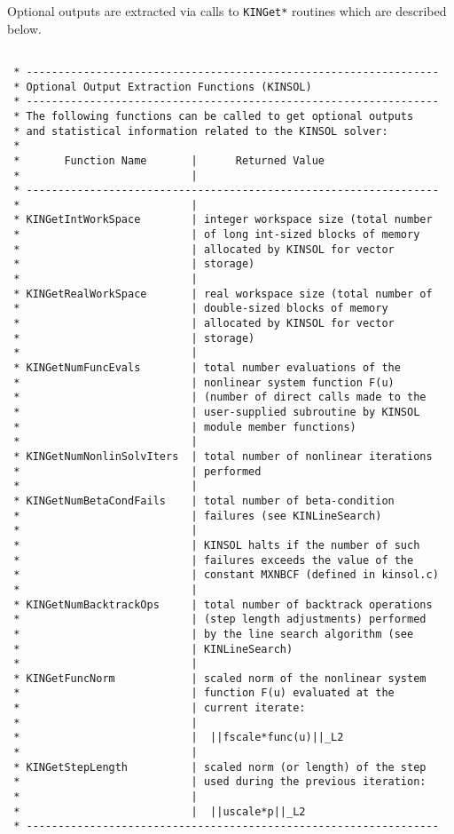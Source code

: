 \documentclass[11pt]{article}
\begin{document}
Optional outputs are extracted via calls to {\tt KINGet*} routines which
are described below.
\small
\begin{verbatim}

 * -----------------------------------------------------------------
 * Optional Output Extraction Functions (KINSOL)
 * -----------------------------------------------------------------
 * The following functions can be called to get optional outputs
 * and statistical information related to the KINSOL solver:
 *
 *       Function Name       |      Returned Value
 *                           |
 * -----------------------------------------------------------------
 *                           |
 * KINGetIntWorkSpace        | integer workspace size (total number
 *                           | of long int-sized blocks of memory
 *                           | allocated by KINSOL for vector
 *                           | storage)
 *                           |
 * KINGetRealWorkSpace       | real workspace size (total number of
 *                           | double-sized blocks of memory
 *                           | allocated by KINSOL for vector
 *                           | storage)
 *                           |
 * KINGetNumFuncEvals        | total number evaluations of the
 *                           | nonlinear system function F(u)
 *                           | (number of direct calls made to the
 *                           | user-supplied subroutine by KINSOL
 *                           | module member functions)
 *                           |
 * KINGetNumNonlinSolvIters  | total number of nonlinear iterations
 *                           | performed
 *                           |
 * KINGetNumBetaCondFails    | total number of beta-condition
 *                           | failures (see KINLineSearch)
 *                           |
 *                           | KINSOL halts if the number of such
 *                           | failures exceeds the value of the
 *                           | constant MXNBCF (defined in kinsol.c)
 *                           |
 * KINGetNumBacktrackOps     | total number of backtrack operations
 *                           | (step length adjustments) performed
 *                           | by the line search algorithm (see
 *                           | KINLineSearch)
 *                           |
 * KINGetFuncNorm            | scaled norm of the nonlinear system
 *                           | function F(u) evaluated at the
 *                           | current iterate:
 *                           |
 *                           |  ||fscale*func(u)||_L2
 *                           |
 * KINGetStepLength          | scaled norm (or length) of the step
 *                           | used during the previous iteration:
 *                           |
 *                           |  ||uscale*p||_L2
 * -----------------------------------------------------------------


\end{verbatim}
\end{document}
